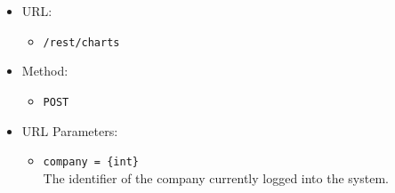 \begin{itemize}

    \item URL:
    \begin{itemize}
        \item \texttt{/rest/charts}
    \end{itemize}

    \item Method:
    \begin{itemize}
        \item \texttt{POST}
    \end{itemize}

    \item URL Parameters:
    \begin{itemize}
        \item \texttt{company = \{int\}} \\
        The identifier of the company currently logged into the system.
    \end{itemize}


\end{itemize}
